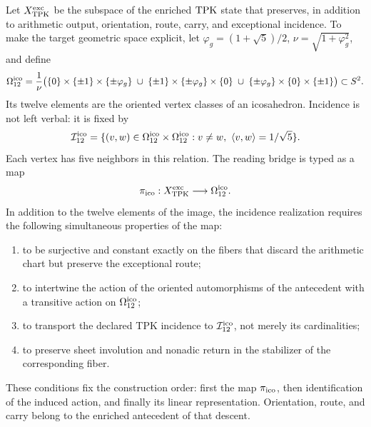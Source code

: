 Let \(X_{\rm TPK}^{\rm exc}\) be the subspace of the enriched \(\mathrm{TPK}\) state
that preserves, in addition to arithmetic output, orientation, route,
carry, and exceptional incidence. To make the target geometric space explicit,
let \(\varphi_g=(1+\sqrt5)/2\), \(\nu=\sqrt{1+\varphi_g^2}\), and define
\begin{equation}
\label{ii:pent:eq:gravity-icosahedron-vertices}
\Omega_{12}^{\rm ico}
=\frac1\nu\bigl(
\{0\}\times\{\pm1\}\times\{\pm\varphi_g\}
\;\cup\;
\{\pm1\}\times\{\pm\varphi_g\}\times\{0\}
\;\cup\;
\{\pm\varphi_g\}\times\{0\}\times\{\pm1\}
\bigr)\subset S^2.
\end{equation}
Its twelve elements are the oriented vertex classes of an icosahedron.
Incidence is not left verbal: it is fixed by
\begin{equation}
\label{ii:pent:eq:gravity-icosahedron-incidence}
\mathcal I_{12}^{\rm ico}
=\{(v,w)\in\Omega_{12}^{\rm ico}\times\Omega_{12}^{\rm ico}:
v\neq w,\ \langle v,w\rangle=1/\sqrt5\}.
\end{equation}
Each vertex has five neighbors in this relation. The reading bridge
is typed as a map
\begin{equation}
\label{ii:pent:eq:gravity-exceptional-reader-map}
\pi_{\rm ico}:X_{\rm TPK}^{\rm exc}\longrightarrow\Omega_{12}^{\rm ico}.
\end{equation}
In addition to the twelve elements of the image, the incidence realization
requires the following simultaneous properties of the map:
\begin{enumerate}[label=(\roman*)]
\item to be surjective and constant exactly on the fibers that discard
the arithmetic chart but preserve the exceptional route;
\item to intertwine the action of the oriented automorphisms of the antecedent
with a transitive action on \(\Omega_{12}^{\rm ico}\);
\item to transport the declared TPK incidence to
\(\mathcal I_{12}^{\rm ico}\), not
merely its cardinalities;
\item to preserve sheet involution and nonadic return in the
stabilizer of the corresponding fiber.
\end{enumerate}

These conditions fix the construction order: first the map
\(\pi_{\rm ico}\), then identification of the induced action, and
finally its linear representation. Orientation, route, and carry
belong to the enriched antecedent of that descent.

